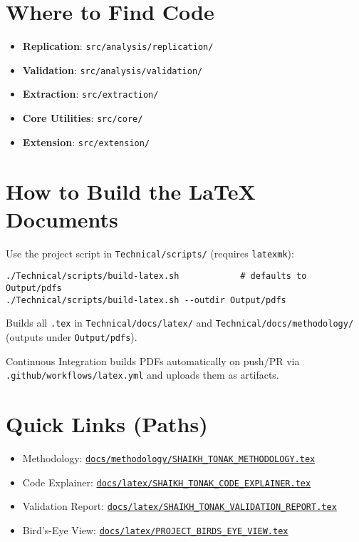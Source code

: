 \documentclass[12pt,a4paper]{article}
\begin{document}
\section{Where to Find Code}
\begin{itemize}[leftmargin=1.2em]
    \item \textbf{Replication}: \texttt{src/analysis/replication/}
    \item \textbf{Validation}: \texttt{src/analysis/validation/}
    \item \textbf{Extraction}: \texttt{src/extraction/}
    \item \textbf{Core Utilities}: \texttt{src/core/}
    \item \textbf{Extension}: \texttt{src/extension/}
\end{itemize}

\section{How to Build the LaTeX Documents}
\begin{tcolorbox}[colback=blue!5!white,colframe=blue!75!black,title=Build Commands]
Use the project script in \texttt{Technical/scripts/} (requires \texttt{latexmk}):
\begin{verbatim}
./Technical/scripts/build-latex.sh            # defaults to Output/pdfs
./Technical/scripts/build-latex.sh --outdir Output/pdfs
\end{verbatim}
Builds all \texttt{.tex} in \texttt{Technical/docs/latex/} and \texttt{Technical/docs/methodology/} (outputs under \texttt{Output/pdfs}).
\end{tcolorbox}

\noindent Continuous Integration builds PDFs automatically on push/PR via \texttt{.github/workflows/latex.yml} and uploads them as artifacts.

\section{Quick Links (Paths)}
\begin{itemize}[leftmargin=1.2em]
    \item Methodology: \href{run:docs/methodology/SHAIKH_TONAK_METHODOLOGY.tex}{\texttt{docs/methodology/SHAIKH\_TONAK\_METHODOLOGY.tex}}
    \item Code Explainer: \href{run:docs/latex/SHAIKH_TONAK_CODE_EXPLAINER.tex}{\texttt{docs/latex/SHAIKH\_TONAK\_CODE\_EXPLAINER.tex}}
    \item Validation Report: \href{run:docs/latex/SHAIKH_TONAK_VALIDATION_REPORT.tex}{\texttt{docs/latex/SHAIKH\_TONAK\_VALIDATION\_REPORT.tex}}
    \item Bird's-Eye View: \href{run:docs/latex/PROJECT_BIRDS_EYE_VIEW.tex}{\texttt{docs/latex/PROJECT\_BIRDS\_EYE\_VIEW.tex}}
\end{itemize}
\end{document}
